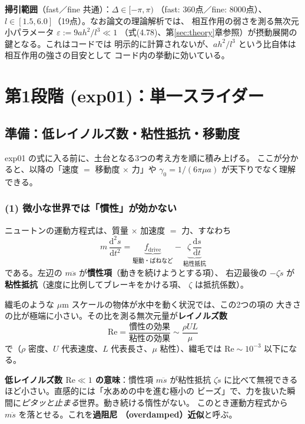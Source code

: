 \documentclass[11pt,a4paper]{article}
\newcommand{\gamz}{\gamma_{0}}
\newcommand{\dd}{\mathrm{d}}
\begin{document}
\medskip\noindent
\textbf{掃引範囲}（fast／fine 共通）：$\Delta\in[-\pi,\pi)$
（fast: 360点／fine: 8000点）、$l\in[1.5,6.0]$（19点）。なお論文の理論解析では、
相互作用の弱さを測る無次元小パラメータ $\varepsilon:=9ah^2/l^3\ll1$
（式(4.78)、第\ref{sec:theory}章参照）が摂動展開の鍵となる。これはコードでは
明示的に計算されないが、$ah^2/l^3$ という比自体は相互作用の強さの目安として
コード内の挙動に効いている。

\section{第1段階 (exp01)：単一スライダー}

\subsection{準備：低レイノルズ数・粘性抵抗・移動度}\label{sec:primer}

exp01 の式に入る前に、土台となる3つの考え方を順に積み上げる。
ここが分かると、以降の「速度 $=$ 移動度 $\times$ 力」や
$\gamz=1/(6\pi\mu a)$ が天下りでなく理解できる。

\subsubsection{(1) 微小な世界では「慣性」が効かない}

ニュートンの運動方程式は、質量 $\times$ 加速度 $=$ 力、すなわち
\begin{equation}
m\,\frac{\dd^2 s}{\dd t^2}
=\underbrace{f_{\mathrm{drive}}}_{\text{駆動・ばねなど}}
-\underbrace{\zeta\,\frac{\dd s}{\dd t}}_{\text{粘性抵抗}}
\end{equation}
である。左辺の $m\ddot s$ が\textbf{慣性項}（動きを続けようとする項）、
右辺最後の $-\zeta\dot s$ が\textbf{粘性抵抗}（速度に比例してブレーキをかける項、
$\zeta$ は抵抗係数）。

繊毛のような $\mu\mathrm{m}$ スケールの物体が水中を動く状況では、この2つの項の
大きさの比が極端に小さい。その比を測る無次元量が\textbf{レイノルズ数}
\begin{equation}
\mathrm{Re}=\frac{\text{慣性の効果}}{\text{粘性の効果}}\sim\frac{\rho U L}{\mu}
\end{equation}
で（$\rho$ 密度、$U$ 代表速度、$L$ 代表長さ、$\mu$ 粘性）、繊毛では
$\mathrm{Re}\sim10^{-3}$ 以下になる。

\begin{keybox}
\textbf{低レイノルズ数 $\mathrm{Re}\ll1$ の意味}：慣性項 $m\ddot s$ が粘性抵抗
$\zeta\dot s$ に比べて無視できるほど小さい。直感的には「水あめの中を進む極小の
ビーズ」で、力を抜いた瞬間に\emph{ピタッと止まる}世界。動き続ける惰性がない。
このとき運動方程式から $m\ddot s$ を落とせる。これを\textbf{過阻尼
（overdamped）近似}と呼ぶ。
\end{keybox}
\end{document}
